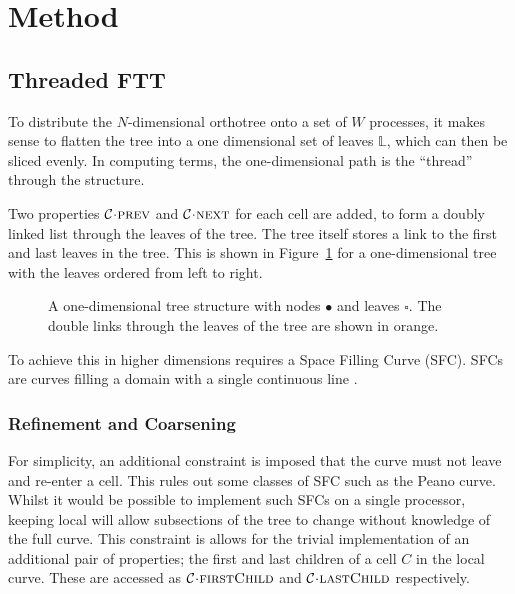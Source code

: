 \documentclass[twoside]{IIBproject}
\newcommand{\acc}{{\mkern 0.5mu\cdot\mkern 0.5mu}}
\numberwithin{figure}{section}
\begin{document}
\section{Method} %
    \label{sec:method}

    \subsection{Threaded FTT} %
        \label{sec:tftt}

        To distribute the $N$-dimensional orthotree onto a set of $W$ processes, it makes sense to flatten the tree into a one dimensional set of leaves $\mathbb{L}$, which can then be sliced evenly. In computing terms, the one-dimensional path is the ``thread'' through the structure. 

        Two properties $\mathcal{C}\acc\textproc{prev}$ and $\mathcal{C}\acc\textproc{next}$ for each cell are added, to form a doubly linked list through the leaves of the tree. The tree itself stores a link to the first and last leaves in the tree. This is shown in Figure~\ref{fig:tftt-flattree} for a one-dimensional tree with the leaves ordered from left to right. 

        \begin{figure}[!htbp]
            \centering
            
            \caption{A one-dimensional tree structure with nodes $\bullet$ and leaves $\square$. The double links through the leaves of the tree are shown in orange.}
            \label{fig:tftt-flattree}
        \end{figure}

        To achieve this in higher dimensions requires a Space Filling Curve (SFC). SFCs are curves filling a domain with a single continuous line \cite{bader2013}. 


        \subsubsection{Refinement and Coarsening} %
            \label{sec:tftt-refine}

            For simplicity, an additional constraint is imposed that the curve must not leave and re-enter a cell. This rules out some classes of SFC such as the Peano curve. Whilst it would be possible to implement such SFCs on a single processor, keeping local will allow subsections of the tree to change without knowledge of the full curve. This constraint is allows for the trivial implementation of  an additional pair of properties; the first and last children of a cell $C$ in the local curve. These are accessed as $\mathcal{C}\acc\textproc{firstChild}$ and $\mathcal{C}\acc\textproc{lastChild}$ respectively.
\end{document}
